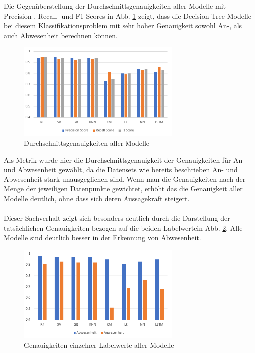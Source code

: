 \newpage

Die Gegenüberstellung der Durchschnittsgenauigkeiten aller Modelle mit Precision-, Recall- und F1-Scores in 
Abb. \ref{fig:ResAll}  zeigt, dass die Decision Tree Modelle bei diesem Klassifikationsproblem mit sehr hoher
Genauigkeit sowohl An-, als auch Abwesenheit berechnen können.
\begin{figure}[h]
    \centering
    \includegraphics[width=0.7\textwidth]{pic/results_all.png}
    \caption{Durchschnittsgenauigkeiten aller Modelle}
    \label{fig:ResAll}
\end{figure}

Als Metrik wurde hier die Durchschnittsgenauigkeit der Genauigkeiten für An- und Abwesenheit gewählt, da die 
Datensets wie bereits beschrieben An- und Abwesenheit stark unausgeglichen sind. Wenn man die Genauigkeiten
nach der Menge der jeweiligen Datenpunkte gewichtet, erhöht das die Genauigkeit aller Modelle deutlich,
ohne dass sich deren Aussagekraft steigert.\\\\ 
Dieser Sachverhalt zeigt sich besonders deutlich durch die Darstellung der tatsächlichen Genauigkeiten bezogen 
auf die beiden Labelwertein Abb. \ref{fig:ResSpec}. Alle Modelle sind deutlich besser in der Erkennung von 
Abwesenheit.

\begin{figure}[h]
    \centering
    \includegraphics[width=0.7\textwidth]{pic/results_spec.png}
    \caption{Genauigkeiten einzelner Labelwerte aller Modelle}
    \label{fig:ResSpec}
\end{figure}

